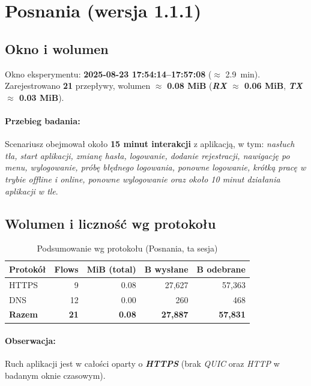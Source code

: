 \section{Posnania (wersja 1.1.1)}
\label{sec:posnania}

\subsection*{Okno i wolumen}
Okno eksperymentu: \textbf{2025-08-23 17{:}54{:}14–17{:}57{:}08} ($\approx$ \SI{2.9}{\minute}). 
Zarejestrowano \textbf{21} przepływy, wolumen $\approx$ \textbf{0.08 MiB} 
(\textbf{\emph{RX} $\approx$ 0.06 MiB}, \textbf{\emph{TX} $\approx$ 0.03 MiB}).

\paragraph{Przebieg badania:} 
Scenariusz obejmował około \textbf{15 minut interakcji} z aplikacją, w tym: 
\emph{nasłuch tła, start aplikacji, zmianę hasła, logowanie, dodanie rejestracji, nawigację po menu, wylogowanie, próbę błędnego logowania, ponowne logowanie, krótką pracę w trybie offline i online, ponowne wylogowanie oraz około 10 minut działania aplikacji w tle}.

\subsection{Wolumen i liczność wg protokołu}
\begin{table}[H]
  \centering
  \caption{Podsumowanie wg protokołu (Posnania, ta sesja)}
  \label{tab:posnania-proto}
  \begin{tabular}{lrrrr}
    \toprule
    \textbf{Protokół} & \textbf{Flows} & \textbf{MiB (total)} & \textbf{B wysłane} & \textbf{B odebrane} \\
    \midrule
    HTTPS & 9  & 0.08 & 27{,}627 & 57{,}363 \\
    DNS   & 12 & 0.00 & 260      & 468 \\
    \midrule
    \textbf{Razem} & \textbf{21} & \textbf{0.08} & \textbf{27{,}887} & \textbf{57{,}831} \\
    \bottomrule
  \end{tabular}
\end{table}

\paragraph{Obserwacja:} 
Ruch aplikacji jest w całości oparty o \textbf{\emph{HTTPS}} (brak \emph{QUIC} oraz \emph{HTTP} w badanym oknie czasowym).

